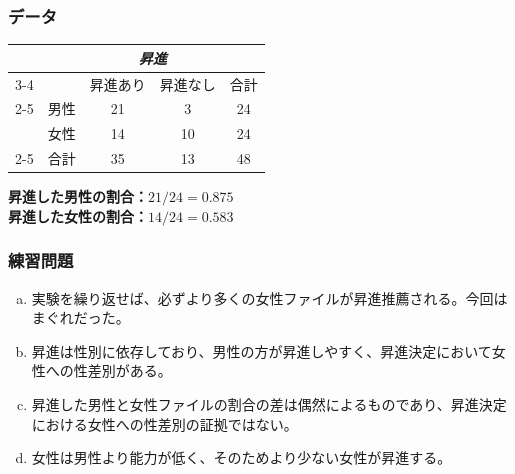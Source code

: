 \begin{frame}
\frametitle{データ}


\begin{center}
\begin{tabular}{ll  cc c}
        &               & \multicolumn{2}{c}{\textit{昇進}} \\
\cline{3-4}
                        &           & 昇進あり  & 昇進なし  & 合計  \\
\cline{2-5}
\multirow{2}{*}{\textit{性別}}  &男性    & 21        & 3     & 24    \\
                        &女性        & 14        & 10    & 24 \\
\cline{2-5}
                        &合計        & 35        & 13    & 48 \\
\end{tabular}
\end{center}

\textbf{昇進した男性の割合：$21 / 24 = 0.875$} \\
\textbf{昇進した女性の割合：$14 / 24 = 0.583$}

\end{frame}


\begin{frame}[shrink=25]
\frametitle{練習問題}


\begin{enumerate}[(a)]

\item 実験を繰り返せば、必ずより多くの女性ファイルが昇進推薦される。今回はまぐれだった。

\item 昇進は性別に依存しており、男性の方が昇進しやすく、昇進決定において女性への性差別がある。

\item 昇進した男性と女性ファイルの割合の差は偶然によるものであり、昇進決定における女性への性差別の証拠ではない。

\item 女性は男性より能力が低く、そのためより少ない女性が昇進する。

\end{enumerate}

\end{frame}

